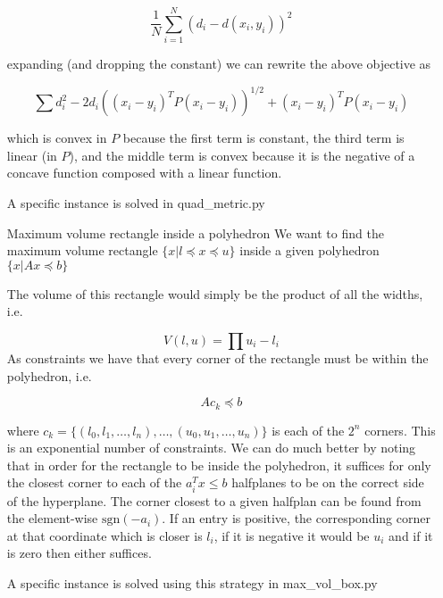 \documentclass[12pt]{article}
\begin{document}
\begin{itemize}
  $$\frac{1}{N} \sum_{i=1}^N (d_i - d(x_i, y_i))^2$$

  expanding (and dropping the constant) we can rewrite the above objective as

  $$\sum d_i^2 - 2d_i \left( (x_i-y_i)^T P (x_i-y_i) \right)^{1/2} + (x_i-y_i)^T P (x_i-y_i)$$

  which is convex in $P$ because the first term is constant, the third term is linear (in $P$), and the middle term is convex because it is the negative of a concave function composed with a linear function.

  A specific instance is solved in quad_metric.py 
  
\item[Maximum volume rectangle inside a polyhedron]
  We want to find the maximum volume rectangle $\{x | l \preceq x \preceq u\}$ inside a given polyhedron $\{x | Ax \preceq b\}$

  The volume of this rectangle would simply be the product of all the widths, i.e.

  $$V(l, u) = \prod u_i - l_i $$
  As constraints we have that every corner of the rectangle must be within the polyhedron, i.e.

  $$A c_k \preceq b$$

  where $c_k = \{ (l_0, l_1, \ldots, l_n), \ldots, (u_0, u_1, \ldots, u_n) \}$ is each of the $2^n$ corners. This is an exponential number of constraints.
  We can do much better by noting that in order for the rectangle to be inside the polyhedron, it suffices for only the closest corner to each of the $a_i^T x \leq b$ halfplanes to be on the correct side of the hyperplane. The corner closest to a given halfplan can be found from the element-wise $\text{sgn}(-a_i)$. If an entry is positive, the corresponding corner at that coordinate which is closer is $l_i$, if it is negative it would be $u_i$ and if it is zero then either suffices.

  A specific instance is solved using this strategy in max_vol_box.py
  
\end{itemize}
\end{document}

